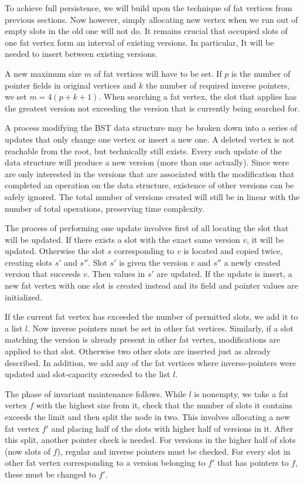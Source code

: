To achieve full persistence, we will build upon the technique of fat vertices from previous sections. Now however, simply allocating new vertex when we run out of empty slots in the old one will not do. It remains crucial that occupied slots of one fat vertex form an interval of existing versions. In particular, It will be needed to insert between existing versions.

A new maximum size $m$ of fat vertices will have to be set. If $p$ is the number of pointer fields in original vertices and $k$ the number of required inverse pointers, we set $m = 4(p+k+1)$.
When searching a fat vertex, the slot that applies has the greatest version not exceeding the version that is currently being searched for.

A process modifying the BST data structure may be broken down into a series of updates that only change one vertex or insert a new one. A deleted vertex is not reachable from the root, but technically still exists.
Every such update of the data structure will produce a new version (more than one actually). Since were are only interested in the versions that are associated with the modification that completed an operation on the data structure, existence of other versions can be safely ignored. The total number of versions created will still be in linear with the number of total operations, preserving time complexity.

The process of performing one update involves first of all locating the slot that will be updated. If there exists a slot with the exact same version $v$, it will be updated. Otherwise the slot $s$ corresponding to $v$ is located and copied twice, creating slots $s'$ and $s''$. Slot $s'$ is given the version $v$ and $s''$ a newly created version that succeeds $v$. Then values in $s'$ are updated.
If the update is insert, a new fat vertex with one slot is created instead and its field and pointer values are initialized.

If the current fat vertex has exceeded the number of permitted slots, we add it to a list $l$.
Now inverse pointers must be set in other fat vertices. Similarly, if a slot matching the version is already present in other fat vertex, modifications are applied to that slot. Otherwise two other slots are inserted just as already described. In addition, we add any of the fat vertices where inverse-pointers were updated and slot-capacity exceeded to the list $l$.

The phase of invariant maintenance follows. While $l$ is nonempty, we take a fat vertex $f$ with the highest size from it, check that the number of slots it contains exceeds the limit and then split the node in two. This involves allocating a new fat vertex $f'$ and placing half of the slots with higher half of versions in it. After this split, another pointer check is needed. For versions in the higher half of slots (now slots of $f$), regular and inverse pointers must be checked. For every slot in other fat vertex corresponding to a version belonging to $f'$  that has pointers to $f$, these must be changed to $f'$. 

